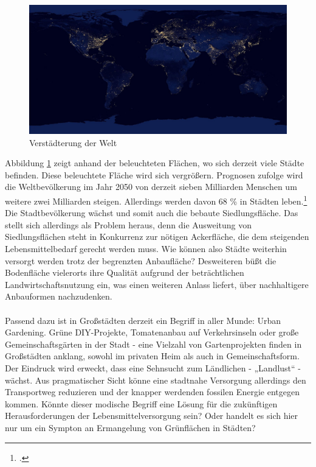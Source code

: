 \documentclass{scrartcl}
\begin{document}
\begin{figure}[htbp]
\centering
\hspace*{-1,8cm}   
\includegraphics[width=18cm]{image_folder/The_earth_at_night.jpg}
\caption{Verstädterung der Welt}
\label{fig:sattelitenbild}
\end{figure}

Abbildung \ref{fig:sattelitenbild} zeigt anhand der beleuchteten Flächen, wo sich derzeit viele Städte befinden. Diese beleuchtete Fläche wird sich vergrößern. Prognosen zufolge wird die  Weltbevölkerung im Jahr 2050 von derzeit sieben Milliarden Menschen um weitere zwei Milliarden steigen. Allerdings werden davon 68 \% in Städten leben.\footcites[Vgl.][o.P.]{UnitedNationsDESA2018WorldRevision}[][S.3]{UnitedNationsDepartmentofEconomicandSocialAffairs2017World2017} Die Stadtbevölkerung wächst und somit auch die bebaute Siedlungsfläche. Das stellt sich allerdings als Problem heraus, denn die Ausweitung von Siedlungsflächen steht in Konkurrenz zur nötigen Ackerfläche, die dem steigenden Lebensmittelbedarf gerecht werden muss. Wie können also Städte weiterhin versorgt werden trotz der begrenzten Anbaufläche? Desweiteren büßt die Bodenfläche vielerorts ihre Qualität aufgrund der beträchtlichen Landwirtschaftsnutzung ein, was einen weiteren Anlass liefert, über nachhaltigere Anbauformen nachzudenken.\\
\\
Passend dazu ist in Großstädten derzeit ein Begriff in aller Munde: Urban Gardening. Grüne DIY-Projekte, Tomatenanbau auf Verkehrsinseln oder große Gemeinschaftsgärten in der Stadt - eine Vielzahl von Gartenprojekten finden in Großstädten anklang, sowohl im privaten Heim als auch in Gemeinschaftsform. Der Eindruck wird erweckt, dass eine Sehnsucht zum Ländlichen - „Landlust“ - wächst. Aus pragmatischer Sicht könne eine stadtnahe Versorgung allerdings den Transportweg reduzieren und der knapper werdenden fossilen Energie entgegen kommen. Könnte dieser modische Begriff eine Lösung für die zukünftigen Herausforderungen der Lebensmittelversorgung sein? Oder handelt es sich hier nur um ein Sympton an Ermangelung von Grünflächen in Städten? 
\end{document}
